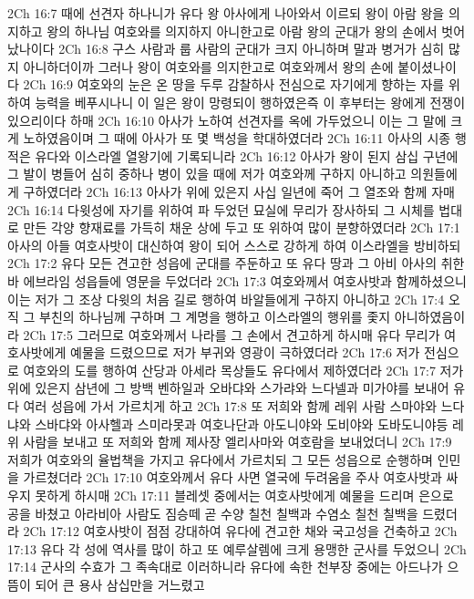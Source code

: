 2Ch 16:7  때에 선견자 하나니가 유다 왕 아사에게 나아와서 이르되 왕이 아람 왕을 의지하고 왕의 하나님 여호와를 의지하지 아니한고로 아람 왕의 군대가 왕의 손에서 벗어났나이다
2Ch 16:8  구스 사람과 룹 사람의 군대가 크지 아니하며 말과 병거가 심히 많지 아니하더이까 그러나 왕이 여호와를 의지한고로 여호와께서 왕의 손에 붙이셨나이다
2Ch 16:9  여호와의 눈은 온 땅을 두루 감찰하사 전심으로 자기에게 향하는 자를 위하여 능력을 베푸시나니 이 일은 왕이 망령되이 행하였은즉 이 후부터는 왕에게 전쟁이 있으리이다 하매
2Ch 16:10  아사가 노하여 선견자를 옥에 가두었으니 이는 그 말에 크게 노하였음이며 그 때에 아사가 또 몇 백성을 학대하였더라
2Ch 16:11  아사의 시종 행적은 유다와 이스라엘 열왕기에 기록되니라
2Ch 16:12  아사가 왕이 된지 삼십 구년에 그 발이 병들어 심히 중하나 병이 있을 때에 저가 여호와께 구하지 아니하고 의원들에게 구하였더라
2Ch 16:13  아사가 위에 있은지 사십 일년에 죽어 그 열조와 함께 자매
2Ch 16:14  다윗성에 자기를 위하여 파 두었던 묘실에 무리가 장사하되 그 시체를 법대로 만든 각양 향재료를 가득히 채운 상에 두고 또 위하여 많이 분향하였더라
2Ch 17:1  아사의 아들 여호사밧이 대신하여 왕이 되어 스스로 강하게 하여 이스라엘을 방비하되
2Ch 17:2  유다 모든 견고한 성읍에 군대를 주둔하고 또 유다 땅과 그 아비 아사의 취한바 에브라임 성읍들에 영문을 두었더라
2Ch 17:3  여호와께서 여호사밧과 함께하셨으니 이는 저가 그 조상 다윗의 처음 길로 행하여 바알들에게 구하지 아니하고
2Ch 17:4  오직 그 부친의 하나님께 구하며 그 계명을 행하고 이스라엘의 행위를 좇지 아니하였음이라
2Ch 17:5  그러므로 여호와께서 나라를 그 손에서 견고하게 하시매 유다 무리가 여호사밧에게 예물을 드렸으므로 저가 부귀와 영광이 극하였더라
2Ch 17:6  저가 전심으로 여호와의 도를 행하여 산당과 아세라 목상들도 유다에서 제하였더라
2Ch 17:7  저가 위에 있은지 삼년에 그 방백 벤하일과 오바댜와 스가랴와 느다넬과 미가야를 보내어 유다 여러 성읍에 가서 가르치게 하고
2Ch 17:8  또 저희와 함께 레위 사람 스마야와 느다냐와 스바댜와 아사헬과 스미라못과 여호나단과 아도니야와 도비야와 도바도니야등 레위 사람을 보내고 또 저희와 함께 제사장 엘리사마와 여호람을 보내었더니
2Ch 17:9  저희가 여호와의 율법책을 가지고 유다에서 가르치되 그 모든 성읍으로 순행하며 인민을 가르쳤더라
2Ch 17:10  여호와께서 유다 사면 열국에 두려움을 주사 여호사밧과 싸우지 못하게 하시매
2Ch 17:11  블레셋 중에서는 여호사밧에게 예물을 드리며 은으로 공을 바쳤고 아라비아 사람도 짐승떼 곧 수양 칠천 칠백과 수염소 칠천 칠백을 드렸더라
2Ch 17:12  여호사밧이 점점 강대하여 유다에 견고한 채와 국고성을 건축하고
2Ch 17:13  유다 각 성에 역사를 많이 하고 또 예루살렘에 크게 용맹한 군사를 두었으니
2Ch 17:14  군사의 수효가 그 족속대로 이러하니라 유다에 속한 천부장 중에는 아드나가 으뜸이 되어 큰 용사 삼십만을 거느렸고
